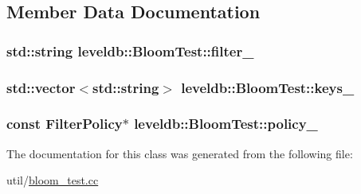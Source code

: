 \subsection{Member Data Documentation}
\hypertarget{classleveldb_1_1_bloom_test_a13fbea63f8f60fd3987745a5110084f1}{}
\subsubsection[{filter\+\_\+}]{\setlength{\rightskip}{0pt plus 5cm}std\+::string leveldb\+::\+Bloom\+Test\+::filter\+\_\+\hspace{0.3cm}{\ttfamily [private]}}\label{classleveldb_1_1_bloom_test_a13fbea63f8f60fd3987745a5110084f1}
\hypertarget{classleveldb_1_1_bloom_test_ad368ca79808b8350f679bb5f049d8095}{}
\subsubsection[{keys\+\_\+}]{\setlength{\rightskip}{0pt plus 5cm}std\+::vector$<$std\+::string$>$ leveldb\+::\+Bloom\+Test\+::keys\+\_\+\hspace{0.3cm}{\ttfamily [private]}}\label{classleveldb_1_1_bloom_test_ad368ca79808b8350f679bb5f049d8095}
\hypertarget{classleveldb_1_1_bloom_test_aad08549895e8878b853205916a074cde}{}
\subsubsection[{policy\+\_\+}]{\setlength{\rightskip}{0pt plus 5cm}const {\bf Filter\+Policy}$\ast$ leveldb\+::\+Bloom\+Test\+::policy\+\_\+\hspace{0.3cm}{\ttfamily [private]}}\label{classleveldb_1_1_bloom_test_aad08549895e8878b853205916a074cde}


The documentation for this class was generated from the following file\+:\begin{DoxyCompactItemize}
\item 
util/\hyperlink{bloom__test_8cc}{bloom\+\_\+test.\+cc}\end{DoxyCompactItemize}
